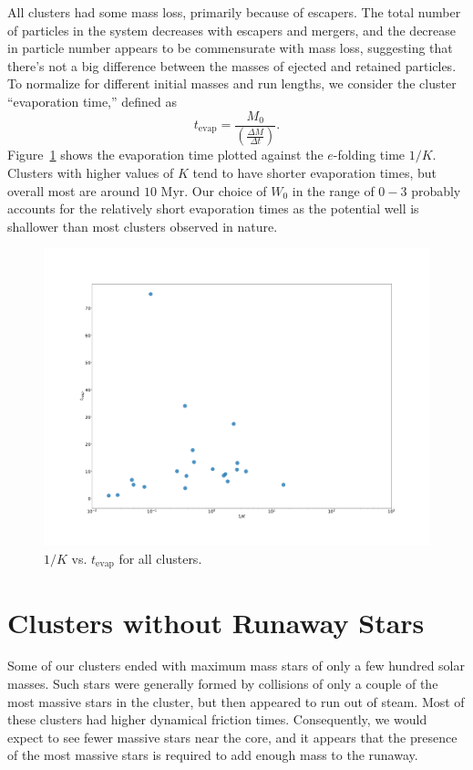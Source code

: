 \documentclass{princeton_astro_thesis}
\newcommand\Myr{\mbox{ Myr}}
\numberwithin{equation}{section}
\begin{document}
All clusters had some mass loss, primarily because of escapers. The total number of particles in the system decreases with escapers and mergers, and the decrease in particle number appears to be commensurate with mass loss, suggesting that there's not a big difference between the masses of ejected and retained particles. To normalize for different initial masses and run lengths, we consider the cluster ``evaporation time,'' defined as 
\begin{equation}
    t_{\mathrm{evap}} = \frac{M_{0}}{\left(\frac{\Delta M}{\Delta t}\right)}.
\end{equation}
Figure~\ref{fig:EvapKplot} shows the evaporation time plotted against the $e$-folding time $1/K$. Clusters with higher values of $K$ tend to have shorter evaporation times, but overall most are around $10 \Myr$.  Our choice of $W_{0}$ in the range of $0 - 3$ probably accounts for the relatively short evaporation times as the potential well is shallower than most clusters observed in nature.

\begin{figure}
\centering
\includegraphics[width=\textwidth]{kevap}
\caption{$1/K$ vs. $t_{\mathrm{evap}}$ for all clusters.}
\label{fig:EvapKplot}
\end{figure}

\section{Clusters without Runaway Stars}
Some of our clusters ended with maximum mass stars of only a few hundred solar masses. Such stars were generally formed by collisions of only a couple of the most massive stars in the cluster, but then appeared to run out of steam. Most of these clusters had higher dynamical friction times.  Consequently, we would expect to see fewer massive stars near the core, and it appears that the presence of the most massive stars is required to add enough mass to the runaway. 
\end{document}
